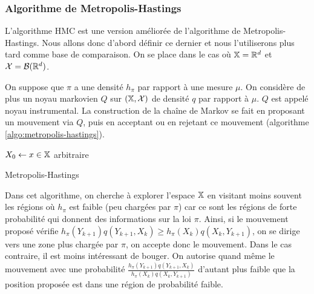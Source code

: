 \documentclass[10pt,a4paper]{article}
\begin{document}
\subsubsection{Algorithme de Metropolis-Hastings}

L'algorithme HMC est une version améliorée de l'algorithme de Metropolis-Hastings. Nous allons donc d'abord définir ce dernier et nous l'utiliserons plus tard comme base de comparaison. On se place dans le cas où $\mathbb{X} = \mathbb{R}^d$ et $\mathcal{X} = \mathcal{B}(\mathbb{R}^d)$. 

On suppose que $\pi$ a une densité $h_\pi$ par rapport à une mesure $\mu$. On considère de plus un noyau markovien $Q$ sur $(\mathbb{X}, \mathcal{X})$ de densité $q$ par rapport à $\mu$. $Q$ est appelé noyau instrumental. La construction de la chaîne de Markov se fait en proposant un mouvement via $Q$, puis en acceptant ou en rejetant ce mouvement (algorithme \ref{algo:metropolis-hastings}).

\begin{center}
\begin{algorithm}[H]
  $X_0 \leftarrow x \in \mathbb{X}$ arbitraire\;
  \caption{Metropolis-Hastings}
  \label{algo:metropolis-hastings}
\end{algorithm}
\end{center}

Dans cet algorithme, on cherche à explorer l'espace $\mathbb{X}$ en visitant moins souvent les régions où $h_\pi$ est faible (peu chargées par $\pi$) car ce sont les régions de forte probabilité qui donnent des informations sur la loi $\pi$. Ainsi, si le mouvement proposé vérifie $h_\pi(Y_{k+1})q(Y_{k+1}, X_k) \geq h_\pi(X_k) q(X_k, Y_{k+1})$, on se dirige vers une zone plus chargée par $\pi$, on accepte donc le mouvement. Dans le cas contraire, il est moins intéressant de bouger. On autorise quand même le mouvement avec une probabilité $\frac{h_\pi(Y_{k+1})q(Y_{k+1},X_k)}{h_\pi(X_k)q(X_k,Y_{k+1})}$ d'autant plus faible que la position proposée est dans une région de probabilité faible.
\end{document}
